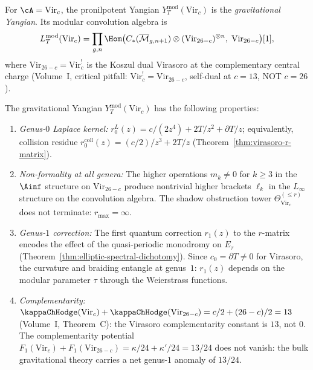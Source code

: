 \begin{definition}
For $\cA = \mathrm{Vir}_c$, the pronilpotent Yangian
$Y_T^{\mathrm{mod}}(\mathrm{Vir}_c)$ is the \emph{gravitational
Yangian}. Its modular convolution algebra is
\[
L_T^{\mathrm{mod}}(\mathrm{Vir}_c)
= \prod_{g,n}
\Hom\bigl(
C_\ast(\overline{\mathcal{M}}_{g,n+1})
\otimes (\mathrm{Vir}_{26-c})^{\otimes n},\;
\mathrm{Vir}_{26-c}
\bigr)[1],
\]
where $\mathrm{Vir}_{26-c} = \mathrm{Vir}_c^!$ is the Koszul
dual Virasoro at the complementary central charge
(Volume~I, critical pitfall: $\mathrm{Vir}_c^! = \mathrm{Vir}_{26-c}$,
self-dual at $c = 13$, NOT $c = 26$).
\end{definition}

\begin{proposition}
The gravitational Yangian
$Y_T^{\mathrm{mod}}(\mathrm{Vir}_c)$ has the following properties:
\begin{enumerate}[label=\textup{(\roman*)}]
\item \emph{Genus-$0$ Laplace kernel:}
$r^L_0(z) = c/(2z^4) + 2T/z^2 + \partial T/z$;
equivalently, collision residue
$r^{\mathrm{coll}}_0(z) = (c/2)/z^3 + 2T/z$
(Theorem~\ref{thm:virasoro-r-matrix}).

\item \emph{Non-formality at all genera:}
The higher operations $m_k \ne 0$ for $k \ge 3$ in the $\Ainf$
structure on $\mathrm{Vir}_{26-c}$ produce nontrivial higher
brackets $\ell_k$ in the $L_\infty$ structure on the convolution
algebra. The shadow obstruction tower $\Theta_{\mathrm{Vir}_c}^{(\le r)}$
does not terminate: $r_{\max} = \infty$.

\item \emph{Genus-$1$ correction:}
The first quantum correction $r_1(z)$ to the $r$-matrix encodes
the effect of the quasi-periodic monodromy on $E_\tau$
(Theorem~\ref{thm:elliptic-spectral-dichotomy}). Since
$c_0 = \partial T \ne 0$ for Virasoro, the curvature and
braiding entangle at genus~$1$: $r_1(z)$ depends on the
modular parameter $\tau$ through the Weierstrass functions.

\item \emph{Complementarity:}
$\kappaChHodge(\mathrm{Vir}_c) + \kappaChHodge(\mathrm{Vir}_{26-c}) = c/2 + (26-c)/2 = 13$
(Volume~I, Theorem~C): the Virasoro complementarity constant
is $13$, not $0$. The complementarity potential
$F_1(\mathrm{Vir}_c) + F_1(\mathrm{Vir}_{26-c})
= \kappa/24 + \kappa'/24 = 13/24$
does not vanish: the bulk gravitational theory carries a net
genus-$1$ anomaly of $13/24$.
\end{enumerate}
\end{proposition}

